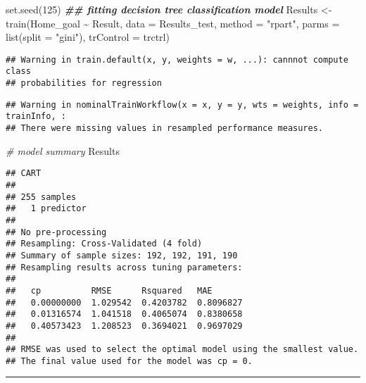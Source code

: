 \documentclass[
]{article}
\newenvironment{Shaded}{\begin{snugshade}}{\end{snugshade}}
\newcommand{\AttributeTok}[1]{\textcolor[rgb]{0.77,0.63,0.00}{#1}}
\newcommand{\CommentTok}[1]{\textcolor[rgb]{0.56,0.35,0.01}{\textit{#1}}}
\newcommand{\DecValTok}[1]{\textcolor[rgb]{0.00,0.00,0.81}{#1}}
\newcommand{\DocumentationTok}[1]{\textcolor[rgb]{0.56,0.35,0.01}{\textbf{\textit{#1}}}}
\newcommand{\FunctionTok}[1]{\textcolor[rgb]{0.00,0.00,0.00}{#1}}
\newcommand{\NormalTok}[1]{#1}
\newcommand{\OtherTok}[1]{\textcolor[rgb]{0.56,0.35,0.01}{#1}}
\newcommand{\SpecialCharTok}[1]{\textcolor[rgb]{0.00,0.00,0.00}{#1}}
\newcommand{\StringTok}[1]{\textcolor[rgb]{0.31,0.60,0.02}{#1}}
\begin{document}
\begin{Shaded}
\begin{Highlighting}[]
\FunctionTok{set.seed}\NormalTok{(}\DecValTok{125}\NormalTok{)}
\DocumentationTok{\#\# fitting decision tree classification model}
\NormalTok{Results }\OtherTok{\textless{}{-}} \FunctionTok{train}\NormalTok{(Home\_goal }\SpecialCharTok{\textasciitilde{}}\NormalTok{ Result,}
                         \AttributeTok{data =}\NormalTok{ Results\_test, }
                         \AttributeTok{method =} \StringTok{"rpart"}\NormalTok{,}
                         \AttributeTok{parms  =} \FunctionTok{list}\NormalTok{(}\AttributeTok{split =} \StringTok{"gini"}\NormalTok{), }
                         \AttributeTok{trControl =}\NormalTok{ trctrl)}
\end{Highlighting}
\end{Shaded}

\begin{verbatim}
## Warning in train.default(x, y, weights = w, ...): cannnot compute class
## probabilities for regression
\end{verbatim}

\begin{verbatim}
## Warning in nominalTrainWorkflow(x = x, y = y, wts = weights, info = trainInfo, :
## There were missing values in resampled performance measures.
\end{verbatim}

\begin{Shaded}
\begin{Highlighting}[]
\CommentTok{\# model summary}
\NormalTok{Results}
\end{Highlighting}
\end{Shaded}

\begin{verbatim}
## CART 
## 
## 255 samples
##   1 predictor
## 
## No pre-processing
## Resampling: Cross-Validated (4 fold) 
## Summary of sample sizes: 192, 192, 191, 190 
## Resampling results across tuning parameters:
## 
##   cp          RMSE      Rsquared   MAE      
##   0.00000000  1.029542  0.4203782  0.8096827
##   0.01316574  1.041518  0.4065074  0.8380658
##   0.40573423  1.208523  0.3694021  0.9697029
## 
## RMSE was used to select the optimal model using the smallest value.
## The final value used for the model was cp = 0.
\end{verbatim}

\begin{center}\rule{0.5\linewidth}{0.5pt}\end{center}
\end{document}
